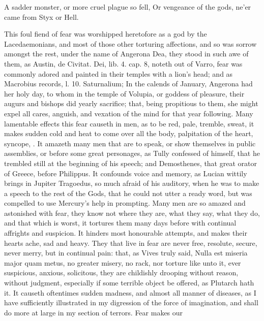 {A sadder monster, or more cruel plague so fell,
Or vengeance of the gods, ne'er came from Styx or Hell.

This foul fiend of fear was worshipped heretofore as a god by the
Lacedaemonians, and most of those other torturing affections, and
so was sorrow amongst the rest, under the name of Angerona Dea, they
stood in such awe of them, as Austin, de Civitat. Dei, lib. 4. cap. 8,
noteth out of Varro, fear was commonly adored and painted in
their temples with a lion's head; and as Macrobius records, l. 10.
Saturnalium; In the calends of January, Angerona had her holy
day, to whom in the temple of Volupia, or goddess of pleasure, their
augurs and bishops did yearly sacrifice; that, being propitious to
them, she might expel all cares, anguish, and vexation of the mind for
that year following. Many lamentable effects this fear causeth in men,
as to be red, pale, tremble, sweat, it makes sudden cold and heat
to come over all the body, palpitation of the heart, syncope, \etc{}. It
amazeth many men that are to speak, or show themselves in public
assemblies, or before some great personages, as Tully confessed of
himself, that he trembled still at the beginning of his speech; and
Demosthenes, that great orator of Greece, before Philippus. It
confounds voice and memory, as Lucian wittily brings in Jupiter
Tragoedus, so much afraid of his auditory, when he was to make a speech
to the rest of the Gods, that he could not utter a ready word, but was
compelled to use Mercury's help in prompting. Many men are so amazed
and astonished with fear, they know not where they are, what they say,
what they do, and that which is worst, it tortures them many days
before with continual affrights and suspicion. It hinders most
honourable attempts, and makes their hearts ache, sad and heavy. They
that live in fear are never free, resolute, secure, never merry,
but in continual pain: that, as Vives truly said, Nulla est miseria
major quam metus, no greater misery, no rack, nor torture like unto it,
ever suspicious, anxious, solicitous, they are childishly drooping
without reason, without judgment, especially if some terrible
object be offered, as Plutarch hath it. It causeth oftentimes sudden
madness, and almost all manner of diseases, as I have sufficiently
illustrated in my  digression of the force of imagination, and
shall do more at large in my section of terrors. Fear makes our
}
